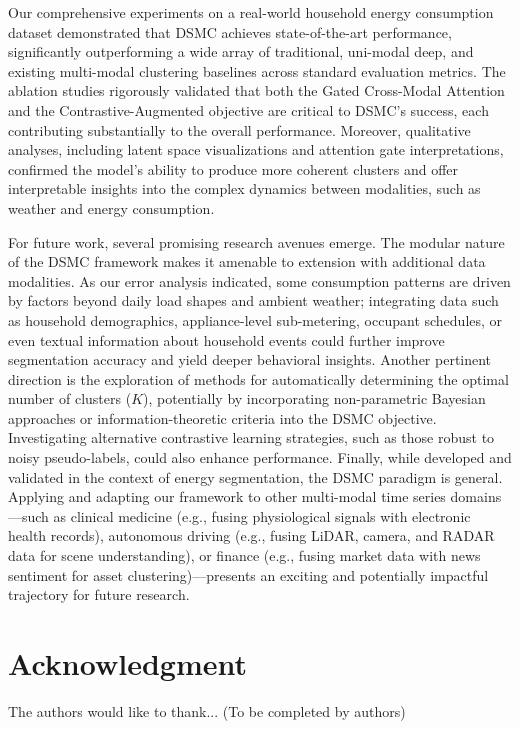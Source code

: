 \documentclass[journal]{IEEEtran}
\begin{document}
Our comprehensive experiments on a real-world household energy consumption dataset demonstrated that DSMC achieves state-of-the-art performance, significantly outperforming a wide array of traditional, uni-modal deep, and existing multi-modal clustering baselines across standard evaluation metrics. The ablation studies rigorously validated that both the Gated Cross-Modal Attention and the Contrastive-Augmented objective are critical to DSMC's success, each contributing substantially to the overall performance. Moreover, qualitative analyses, including latent space visualizations and attention gate interpretations, confirmed the model's ability to produce more coherent clusters and offer interpretable insights into the complex dynamics between modalities, such as weather and energy consumption.

For future work, several promising research avenues emerge. The modular nature of the DSMC framework makes it amenable to extension with additional data modalities. As our error analysis indicated, some consumption patterns are driven by factors beyond daily load shapes and ambient weather; integrating data such as household demographics, appliance-level sub-metering, occupant schedules, or even textual information about household events could further improve segmentation accuracy and yield deeper behavioral insights. Another pertinent direction is the exploration of methods for automatically determining the optimal number of clusters ($K$), potentially by incorporating non-parametric Bayesian approaches or information-theoretic criteria into the DSMC objective. Investigating alternative contrastive learning strategies, such as those robust to noisy pseudo-labels, could also enhance performance. Finally, while developed and validated in the context of energy segmentation, the DSMC paradigm is general. Applying and adapting our framework to other multi-modal time series domains—such as clinical medicine (e.g., fusing physiological signals with electronic health records), autonomous driving (e.g., fusing LiDAR, camera, and RADAR data for scene understanding), or finance (e.g., fusing market data with news sentiment for asset clustering)—presents an exciting and potentially impactful trajectory for future research.


\section*{Acknowledgment}
The authors would like to thank... (To be completed by authors)
\end{document}
